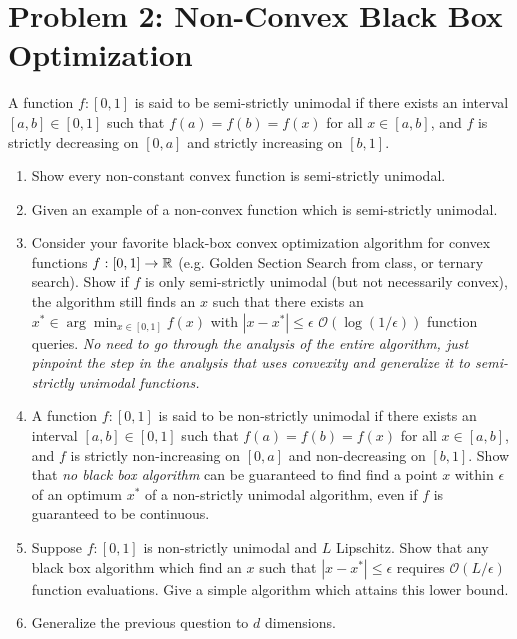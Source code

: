 \documentclass[12pt]{article}
\begin{document}
\section*{Problem 2: Non-Convex Black Box Optimization}
A function $f:[0,1]$ is said to be semi-strictly unimodal if there exists an interval $[a,b] \in [0,1]$ such that $f(a) = f(b) = f(x)$ for all $x \in [a,b]$, and $f$ is strictly decreasing on $[0,a]$ and strictly increasing on $[b,1]$. 
\begin{enumerate}
	\item Show every non-constant convex function is semi-strictly unimodal.
	\item Given an example of a non-convex function which is semi-strictly unimodal.
	\item Consider your favorite black-box convex optimization algorithm for convex functions $f:[0,1] \to \mathbb{R}$ (e.g. Golden Section Search from class, or ternary search). 
	Show if $f$ is only semi-strictly unimodal (but not necessarily convex), the algorithm still finds an $x$ such that there exists an $x^* \in \arg\min_{x \in [0,1]} f(x)$ with $|x-x^*| \le \epsilon$ $\mathcal{O}(\log(1/\epsilon))$ function queries. 
	\emph{No need to go through the analysis of the entire algorithm, just pinpoint the step in the analysis that uses convexity and generalize it to semi-strictly unimodal functions.}
	\item A function $f:[0,1]$ is said to be non-strictly unimodal if there exists an interval $[a,b] \in [0,1]$ such that $f(a) = f(b) = f(x)$ for all $x \in [a,b]$, and $f$ is strictly non-increasing on $[0,a]$ and non-decreasing on $[b,1]$. 
	Show that \emph{no black box algorithm} can be guaranteed to find find a point $x$ within $\epsilon$ of an optimum $x^*$ of a non-strictly unimodal algorithm, even if $f$ is guaranteed to be continuous. 
	\item Suppose $f: [0,1]$ is non-strictly unimodal and $L$ Lipschitz. Show that any black box algorithm which find an $x$ such that $|x-x^*| \le \epsilon$ requires $\mathcal{O}(L/\epsilon)$ function evaluations. Give a simple algorithm which attains this lower bound.
	\item Generalize the previous question to $d$ dimensions. 
\end{enumerate}

\newpage
\end{document}
